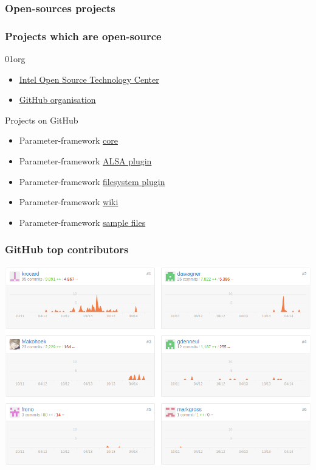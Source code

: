 \subsubsection{Open-sources projects}
\begin{frame}
    \frametitle{Projects which are open-source}
    \begin{block}{01org}
        \begin{itemize}
            \item \href{https://01.org/}{Intel Open Source Technology Center}
            \item \href{https://github.com/orgs/01org/teams/01-org-parameter-framework-owners}{GitHub organisation}
        \end{itemize}
   \end{block}
    \begin{block}{Projects on GitHub}
        \begin{itemize}
            \item Parameter-framework \href{https://github.com/01org/parameter-framework}{core}
            \item Parameter-framework \href{https://github.com/01org/parameter-framework-plugins-alsa}{ALSA plugin}
            \item Parameter-framework \href{https://github.com/01org/parameter-framework-plugins-filesystem}{filesystem plugin}
            \item Parameter-framework \href{https://github.com/01org/parameter-framework/wiki}{wiki}
            \item Parameter-framework \href{https://github.com/01org/parameter-framework-samples}{sample files}
        \end{itemize}
    \end{block}
\end{frame}

\begin{frame}
    \frametitle{GitHub top contributors}
    \centering
    \includegraphics[width=\textwidth]{../../report/src/img/statsGitHub.png}
\end{frame}

